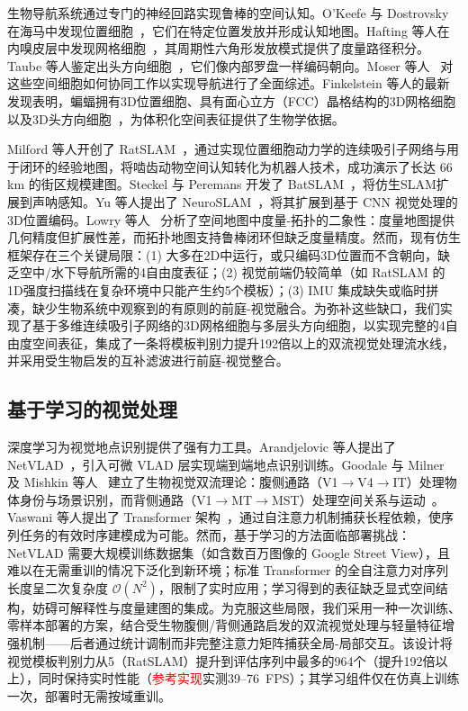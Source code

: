 生物导航系统通过专门的神经回路实现鲁棒的空间认知。O'Keefe 与 Dostrovsky 在海马中发现位置细胞~\cite{OKeefe1971}，它们在特定位置发放并形成认知地图。Hafting 等人在内嗅皮层中发现网格细胞~\cite{Hafting2005}，其周期性六角形发放模式提供了度量路径积分。Taube 等人鉴定出头方向细胞~\cite{Taube1990}，它们像内部罗盘一样编码朝向。Moser 等人~\cite{Moser2017} 对这些空间细胞如何协同工作以实现导航进行了全面综述。Finkelstein 等人的最新发现表明，蝙蝠拥有3D位置细胞、具有面心立方（FCC）晶格结构的3D网格细胞以及3D头方向细胞~\cite{finkelstein2015three, finkelstein2016three}，为体积化空间表征提供了生物学依据。

Milford 等人开创了 RatSLAM~\cite{milford2004ratslam, milford2008mapping}，通过实现位置细胞动力学的连续吸引子网络与用于闭环的经验地图，将啮齿动物空间认知转化为机器人技术，成功演示了长达 66 km 的街区规模建图。Steckel 与 Peremans 开发了 BatSLAM~\cite{steckel2013batslam}，将仿生SLAM扩展到声呐感知。Yu 等人提出了 NeuroSLAM~\cite{Yu2019}，将其扩展到基于 CNN 视觉处理的3D位置编码。Lowry 等人~\cite{Lowry2016} 分析了空间地图中度量-拓扑的二象性：度量地图提供几何精度但扩展性差，而拓扑地图支持鲁棒闭环但缺乏度量精度。然而，现有仿生框架存在三个关键局限：(1) 大多在2D中运行，或只编码3D位置而不含朝向，缺乏空中/水下导航所需的4自由度表征；(2) 视觉前端仍较简单（如 RatSLAM 的1D强度扫描线在复杂环境中只能产生约5个模板）；(3) IMU 集成缺失或临时拼凑，缺少生物系统中观察到的有原则的前庭-视觉融合。为弥补这些缺口，我们实现了基于多维连续吸引子网络的3D网格细胞与多层头方向细胞，以实现完整的4自由度空间表征，集成了一条将模板判别力提升192倍以上的双流视觉处理流水线，并采用受生物启发的互补滤波进行前庭-视觉整合。

\subsection{基于学习的视觉处理}
\label{sec:related_learning}

深度学习为视觉地点识别提供了强有力工具。Arandjelovic 等人提出了 NetVLAD~\cite{Arandjelovic2016}，引入可微 VLAD 层实现端到端地点识别训练。Goodale 与 Milner~\cite{Goodale1992} 及 Mishkin 等人~\cite{Mishkin1983} 建立了生物视觉双流理论：腹侧通路（V1$\rightarrow$V4$\rightarrow$IT）处理物体身份与场景识别，而背侧通路（V1$\rightarrow$MT$\rightarrow$MST）处理空间关系与运动~\cite{DiCarlo2012, Duffy1998}。Vaswani 等人提出了 Transformer 架构~\cite{Vaswani2017}，通过自注意力机制捕获长程依赖，使序列任务的有效时序建模成为可能。然而，基于学习的方法面临部署挑战：NetVLAD 需要大规模训练数据集（如含数百万图像的 Google Street View），且难以在无需重训的情况下泛化到新环境；标准 Transformer 的全自注意力对序列长度呈二次复杂度 $\mathcal{O}(N^2)$，限制了实时应用；学习得到的表征缺乏显式空间结构，妨碍可解释性与度量建图的集成。为克服这些局限，我们采用一种一次训练、零样本部署的方案，结合受生物腹侧/背侧通路启发的双流视觉处理与轻量特征增强机制——后者通过统计调制而非完整注意力矩阵捕获全局-局部交互。该设计将视觉模板判别力从5（RatSLAM）提升到评估序列中最多的964个（提升192倍以上），同时保持实时性能（\textcolor{red}{参考实现}实测39--76~FPS）；其学习组件仅在仿真上训练一次，部署时无需按域重训。

